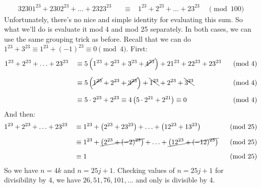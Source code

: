 \begin{solution}[76]
\begin{alignat*}{3}
        2301^{23} + 2302^{23} + \ldots + 2323^{23}
        &&\;\equiv\;&
        1^{23}+2^{23}+\ldots+23^{23} 
        &\;\pmod{100}    
    \end{alignat*}
    Unfortunately, there's no nice and simple identity for evaluating this sum. So what we'll do is evaluate it mod 4 and mod 25 separately. In both cases, we can use the same grouping trick as before. Recall that we can do $1^{23} + 3^{23} \equiv 1^{23} + (-1)^{23} \equiv 0 \pmod 4$. First:
    \begin{alignat*}{3}
        1^{23}+2^{23}+\ldots+23^{23}
        &&\;\equiv\;&
        5\left(1^{23}+2^{23}+3^{23}+\cancel{4^{23}}\right) + 21^{23}+22^{23}+23^{23} 
        &\;\pmod{4}\\[6pt]    
        &&\;\equiv\;&
        5\left(\cancel{1^{23}}+2^{23}+\cancel{3^{23}}\right) + \bcancel{1^{23}}+2^{23}+\bcancel{3^{23}} 
        &\;\pmod{4}\\[6pt]
        &&\;\equiv\;&
        5\cdot2^{23} + 2^{23} \equiv 4\left( 5\cdot2^{21} +2^{21}\right) \equiv 0
        &\;\pmod{4}
    \end{alignat*}
    And then:
    \begin{alignat*}{3}
        1^{23}+2^{23}+\ldots+23^{23}
        &&\;\equiv\;&
        1^{23} + \left(2^{23}+23^{23} \right) + \ldots + \left(12^{23}+13^{23} \right)
        &\;\pmod{25}\\[6pt]    
        &&\;\equiv\;&
        1^{23} + \cancel{\left(2^{23}+(-2)^{23} \right)} + \ldots + \cancel{\left(12^{23}+(-12)^{23} \right) }
        &\;\pmod{25}\\[6pt]
        &&\;\equiv\;&
        1
        &\;\pmod{25}
    \end{alignat*}
    So we have $n=4k$ and $n=25j+1$. Checking values of $n=25j+1$ for divisibility by 4, we have $26, 51, 76, 101, \dots$ and only  is divisible by 4. 
\end{solution}

